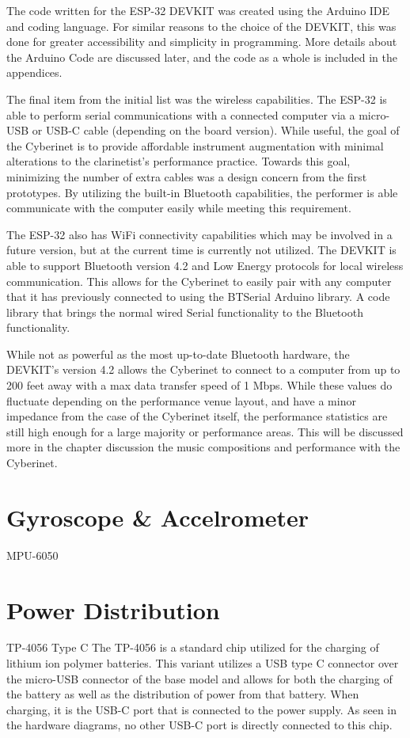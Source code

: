 The code written for the ESP-32 DEVKIT was created using the Arduino IDE and coding language. For similar reasons to the choice of the DEVKIT, this was done for greater accessibility and simplicity in programming. More details about the Arduino Code are discussed later, and the code as a whole is included in the appendices.

The final item from the initial list was the wireless capabilities. The ESP-32 is able to perform serial communications with a connected computer via a micro-USB or USB-C cable (depending on the board version). While useful, the goal of the Cyberinet is to provide affordable instrument augmentation with minimal alterations to the clarinetist's performance practice. Towards this goal, minimizing the number of extra cables was a design concern from the first prototypes. By utilizing the built-in Bluetooth capabilities, the performer is able communicate with the computer easily while meeting this requirement.

The ESP-32 also has WiFi connectivity capabilities which may be involved in a future version, but at the current time is currently not utilized. The DEVKIT is able to support Bluetooth version 4.2 and Low Energy protocols for local wireless communication. This allows for the Cyberinet to easily pair with any computer that it has previously connected to using the BTSerial Arduino library. A code library that brings the normal wired Serial functionality to the Bluetooth functionality.

While not as powerful as the most up-to-date Bluetooth hardware, the DEVKIT's version 4.2 allows the Cyberinet to connect to a computer from up to 200 feet away with a max data transfer speed of 1 Mbps. While these values do fluctuate depending on the performance venue layout, and have a minor impedance from the case of the Cyberinet itself, the performance statistics are still high enough for a large majority or performance areas. This will be discussed more in the chapter discussion the music compositions and performance with the Cyberinet.

\section{Gyroscope \& Accelrometer}
MPU-6050


\section{Power Distribution}
TP-4056 Type C
The TP-4056 is a standard chip utilized for the charging of lithium ion polymer batteries. This variant utilizes a USB type C connector over the micro-USB connector of the base model and allows for both the charging of the battery as well as the distribution of power from that battery. When charging, it is the USB-C port that is connected to the power supply. As seen in the hardware diagrams, no other USB-C port is directly connected to this chip.

